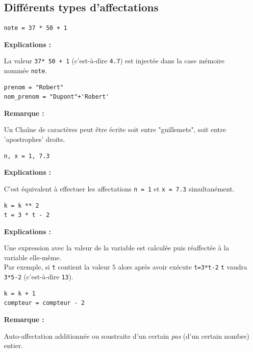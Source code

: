\subsection{Différents types d’affectations}

\begin{myexamples}
	\begin{lstlisting}[numbers=none]
note = 37 * 50 + 1
	\end{lstlisting}
	\textbf{Explications :}
	\begin{minipage}[t]{0.83\linewidth}
		La valeur \lstinline{37* 50 + 1} (c'est-à-dire \lstinline{4.7}) est injectée dans la case mémoire nommée \lstinline{note}.
	\end{minipage}	
	
	\begin{lstlisting}[numbers=none]
prenom = "Robert"
nom_prenom = "Dupont"+'Robert'
	\end{lstlisting}
	\textbf{Remarque :}
	\begin{minipage}[t]{0.85\linewidth}
		Un Chaîne de caractères peut être écrite soit entre "guillemets", soit entre 'apostrophes' droits.
	\end{minipage}
	
	
	\begin{lstlisting}[numbers=none]
n, x = 1, 7.3
	\end{lstlisting}
	\textbf{Explications :}
	\begin{minipage}[t]{0.83\linewidth}
		C'est équivalent à effectuer les affectations \lstinline{n = 1} et  \lstinline{x = 7.3} simultanément.
	\end{minipage}	
	
	
	\begin{lstlisting}[numbers=none]
k = k ** 2
t = 3 * t - 2
	\end{lstlisting}
	\textbf{Explications :}
	\begin{minipage}[t]{0.83\linewidth}
		Une expression avec la valeur de la variable est calculée puis réaffectée à la variable elle-même.\\
		Par exemple, si \lstinline{t} contient la valeur $5$ alors après avoir exécute \lstinline{t=3*t-2} \lstinline{t} vaudra  \lstinline{3*5-2} (c'est-à-dire \lstinline{13}). 
	\end{minipage}
	
	
	
	\begin{lstlisting}[numbers=none]
k = k + 1
compteur = compteur - 2
	\end{lstlisting}
	\textbf{Remarque :}
	\begin{minipage}[t]{0.85\linewidth}
		Auto-affectation additionnée ou soustraite d’un certain \textit{pas} (d’un certain nombre) entier.
	\end{minipage}
\end{myexamples}